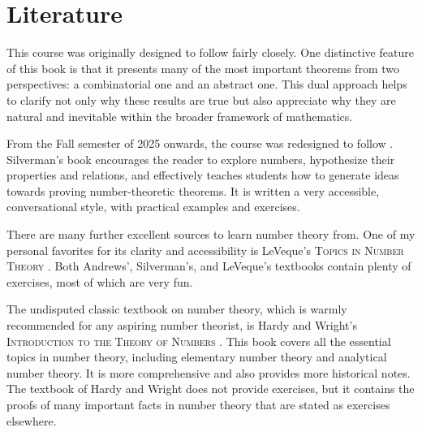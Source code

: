 
\section*{Literature}

This course was originally designed to follow \cite{andrews1994} fairly closely. One distinctive feature of this book is that it presents many of the most important theorems from two perspectives: a combinatorial one and an abstract one. This dual approach helps to clarify not only why these results are true but also appreciate why they are natural and inevitable within the broader framework of mathematics.

From the Fall semester of 2025 onwards, the course was redesigned to follow \cite{silverman2012}. Silverman's book encourages the reader to explore numbers, hypothesize their properties and relations, and effectively teaches students how to generate ideas towards proving number-theoretic theorems. It is written a very accessible, conversational style, with practical examples and exercises.

There are many further excellent sources to learn number theory from. One of my personal favorites for its clarity and accessibility is LeVeque's \textsc{Topics in Number Theory} \cite{leveque1956vol1,leveque1956vol2}. Both Andrews', Silverman's, and LeVeque's textbooks contain plenty of exercises, most of which are very fun.

The undisputed classic textbook on number theory, which is warmly recommended for any aspiring number theorist, is Hardy and Wright's \textsc{Introduction to the Theory of Numbers} \cite{hardy2008}. This book covers all the essential topics in number theory, including elementary number theory and analytical number theory. It is more comprehensive and also provides more historical notes. The textbook of Hardy and Wright does not provide exercises, but it contains the proofs of many important facts in number theory that are stated as exercises elsewhere.

